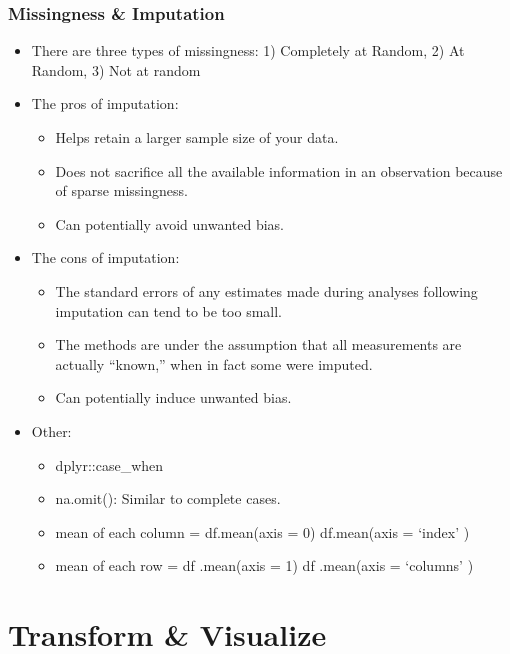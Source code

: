 \documentclass[]{book}
\theoremstyle{definition}
\theoremstyle{definition}
\theoremstyle{definition}
\theoremstyle{remark}
\begin{document}
\subsection{Missingness \& Imputation}\label{missingness-imputation}

\begin{itemize}
\item
  There are three types of missingness: 1) Completely at Random, 2) At
  Random, 3) Not at random
\item
  The pros of imputation:

  \begin{itemize}
  \item
    Helps retain a larger sample size of your data.
  \item
    Does not sacrifice all the available information in an observation
    because of sparse missingness.
  \item
    Can potentially avoid unwanted bias.
  \end{itemize}
\item
  The cons of imputation:

  \begin{itemize}
  \item
    The standard errors of any estimates made during analyses following
    imputation can tend to be too small.
  \item
    The methods are under the assumption that all measurements are
    actually ``known,'' when in fact some were imputed.
  \item
    Can potentially induce unwanted bias.
  \end{itemize}
\item
  Other:

  \begin{itemize}
  \item
    dplyr::case\_when
  \item
    na.omit(): Similar to complete cases.
  \item
    mean of each column = df.mean(axis = 0) \textbar{}\textbar{}
    df.mean(axis = `index' )
  \item
    mean of each row = df .mean(axis = 1) \textbar{}\textbar{} df
    .mean(axis = `columns' )
  \end{itemize}
\end{itemize}

\chapter{Transform \& Visualize}\label{transform-visualize}
\end{document}
